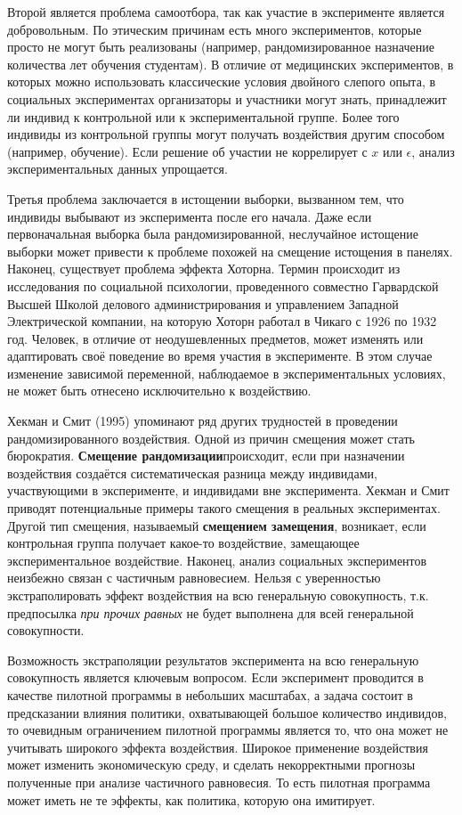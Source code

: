 Второй является проблема самоотбора, так как участие в эксперименте является добровольным. По этическим причинам есть много экспериментов, которые просто не могут быть реализованы (например, рандомизированное назначение количества лет обучения студентам). В отличие от медицинских экспериментов, в которых можно использовать классические условия двойного слепого опыта, в социальных экспериментах организаторы и участники могут знать, принадлежит ли индивид к контрольной или к экспериментальной группе. Более того индивиды из контрольной группы могут получать воздействия другим способом (например, обучение). Если решение об участии не коррелирует с $x$ или $\epsilon$, анализ экспериментальных данных упрощается.


Третья проблема заключается в истощении выборки, вызванном тем, что индивиды выбывают из эксперимента после его начала. Даже если первоначальная выборка была рандомизированной, неслучайное истощение выборки может привести к проблеме похожей на смещение истощения  в панелях. Наконец, существует проблема эффекта Хоторна. Термин происходит из исследования по  социальной психологии, проведенного совместно Гарвардской Высшей Школой делового администрирования и управлением Западной Электрической компании, на которую  Хоторн  работал в Чикаго с 1926 по 1932 год. Человек, в отличие от неодушевленных предметов, может изменять или адаптировать своё поведение во время участия в эксперименте. В этом случае изменение зависимой переменной, наблюдаемое в экспериментальных условиях, не может быть отнесено исключительно к воздействию.


Хекман и Смит (1995) упоминают ряд других трудностей в проведении рандомизированного воздействия. Одной из причин смещения может стать бюрократия. \textbf{Смещение рандомизации}происходит, если при назначении воздействия создаётся  систематическая разница между индивидами, участвующими в эксперименте, и индивидами вне эксперимента.
Хекман и Смит приводят потенциальные примеры такого смещения в реальных экспериментах. Другой тип смещения, называемый \textbf{смещением замещения}, возникает, если контрольная группа получает какое-то воздействие, замещающее экспериментальное воздействие.  Наконец, анализ социальных экспериментов неизбежно связан с частичным равновесием. Нельзя с уверенностью экстраполировать эффект воздействия на всю генеральную совокупность, т.к. предпосылка \textit{при прочих равных} не будет выполнена для всей генеральной совокупности. 


Возможность экстраполяции результатов эксперимента на всю генеральную совокупность является ключевым вопросом. Если эксперимент проводится в качестве пилотной программы в небольших масштабах, а задача состоит в предсказании влияния политики, охватывающей большое количество индивидов, то очевидным ограничением пилотной программы является то, что она  может не учитывать широкого эффекта воздействия. Широкое применение воздействия может изменить экономическую среду, и сделать некорректными прогнозы полученные при анализе частичного равновесия. То есть пилотная программа может иметь не те эффекты, как политика, которую она имитирует.


